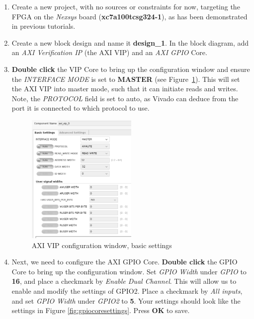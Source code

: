 \documentclass[11pt]{article}
\begin{document}
\begin{enumerate}
    \item Create a new project, with no sources or constraints for now, targeting the FPGA on the \textit{Nexsys} board (\textbf{xc7a100tcsg324-1}), as has been demonstrated in previous tutorials. 
    \item Create a new block design and name it \textbf{design\_1}. In the block diagram, add an \textit{AXI Verification IP} (the AXI VIP) and an \textit{AXI GPIO} Core. 
    \item \textbf{Double click} the VIP Core to bring up the configuration window and ensure the \textit{INTERFACE MODE} is set to \textbf{MASTER} (see Figure~\ref{fig:axivipconfig}). This will set the AXI VIP into master mode, such that it can initiate reads and writes. Note, the \textit{PROTOCOL} field is set to auto, as Vivado can deduce from the port it is connected to which protocol to use. 
    
    \begin{figure}[H]
      \centering
      \includegraphics[width=0.5\textwidth]{axivipconfig.png}
      \caption{AXI VIP configuration window, basic settings}
      \label{fig:axivipconfig}
    \end{figure}
    
    \item Next, we need to configure the AXI GPIO Core. \textbf{Double click} the GPIO Core to bring up the configuration window. Set \textit{GPIO Width} under \textit{GPIO} to \textbf{16}, and place a checkmark by \textit{Enable Dual Channel}. This will allow us to enable and modify the settings of GPIO2. Place a checkmark by \textit{All inputs}, and set \textit{GPIO Width} under \textit{GPIO2} to \textbf{5}. Your settings should look like the settings in Figure \ref{fig:gpiocoresettings}. Press \textbf{OK} to save.
    

\end{enumerate}
\end{document}
